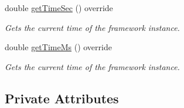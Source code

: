 \begin{DoxyCompactItemize}
double \hyperlink{classflounder_1_1glfwupdater_a6982b83970693347bfa460adc04cf984}{get\+Time\+Sec} () override
\begin{DoxyCompactList}\small\item\em Gets the current time of the framework instance. \end{DoxyCompactList}\item 
double \hyperlink{classflounder_1_1glfwupdater_a1c3b884efb6e785143db556d4db9bdc8}{get\+Time\+Ms} () override
\begin{DoxyCompactList}\small\item\em Gets the current time of the framework instance. \end{DoxyCompactList}\end{DoxyCompactItemize}
\subsection*{Private Attributes}
